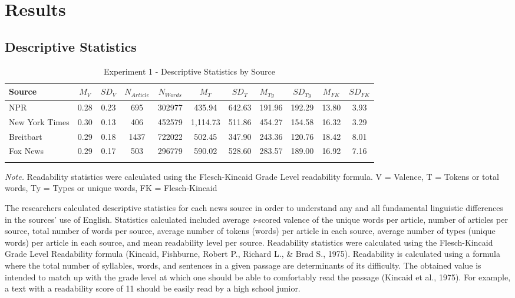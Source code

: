 \documentclass[english,,man]{apa6}
\begin{document}
\section{Results}\label{results}

\subsection{Descriptive Statistics}\label{descriptive-statistics}

\begin{table}[tbp]
\begin{center}
\begin{threeparttable}
\caption{\label{tab:exp1-source-descriptives}Experiment 1 - Descriptive Statistics by Source}
\begin{tabular}{lcccccclccc}
\toprule
Source & $M_V$ & $SD_V$ & $N_{Article}$ & $N_{Words}$ & $M_T$ & $SD_T$ & $M_{Ty}$ & $SD_{Ty}$ & $M_{FK}$ & $SD_{FK}$\\
\midrule
NPR & 0.28 & 0.23 & 695 & 302977 & 435.94 & 642.63 & 191.96 & 192.29 & 13.80 & 3.93\\
New York Times & 0.30 & 0.13 & 406 & 452579 & 1,114.73 & 511.86 & 454.27 & 154.58 & 16.32 & 3.29\\
Breitbart & 0.29 & 0.18 & 1437 & 722022 & 502.45 & 347.90 & 243.36 & 120.76 & 18.42 & 8.01\\
Fox News & 0.29 & 0.17 & 503 & 296779 & 590.02 & 528.60 & 283.57 & 189.00 & 16.92 & 7.16\\
\bottomrule
\addlinespace
\end{tabular}
\begin{tablenotes}[para]
\normalsize{\textit{Note.} Readability statistics were calculated using the Flesch-Kincaid Grade Level readability formula. V = Valence, T = Tokens or total words, Ty = Types or unique words, FK = Flesch-Kincaid}
\end{tablenotes}
\end{threeparttable}
\end{center}
\end{table}

The researchers calculated descriptive statistics for each news source
in order to understand any and all fundamental linguistic differences in
the sources' use of English. Statistics calculated included average
\emph{z}-scored valence of the unique words per article, number of
articles per source, total number of words per source, average number of
tokens (words) per article in each source, average number of types
(unique words) per article in each source, and mean readability level
per source. Readability statistics were calculated using the
Flesch-Kincaid Grade Level Readability formula (Kincaid, Fishburne,
Robert P., Richard L., \& Brad S., 1975). Readability is calculated
using a formula where the total number of syllables, words, and
sentences in a given passage are determinants of its difficulty. The
obtained value is intended to match up with the grade level at which one
should be able to comfortably read the passage (Kincaid et al., 1975).
For example, a text with a readability score of 11 should be easily read
by a high school junior.
\end{document}
